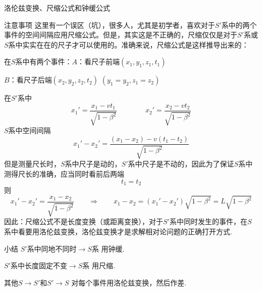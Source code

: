 \documentclass[a4paper,titlepage,onecolmn]{ctexart}
\begin{document}
\begin{section}{洛伦兹变换、尺缩公式和钟缓公式}
\begin{subsection}{注意事项}
这里有一个误区（坑），很多人，尤其是初学者，喜欢对于$S'$系中的两个事件的空间间隔应用尺缩公式。但是，其实这是不正确的，尺缩仅仅是对于$S'$系或$S$系中实实在在的尺子才可以使用的。准确来说，尺缩公式是这样推导出来的：

在$S$系中有两个事件：$A$：看尺子前端$(x_1,y_1,z_1,t_1)$

\hspace{10em} $B$：看尺子后端$(x_2,y_2,z_2,t_2)$ \hspace{4em} $(y_1=y_2,z_1=z_2)$

在$S'$系中
\begin{equation*}
x_1'=\frac{x_1-vt_1}{\sqrt{1-\beta^2}} \hspace{4em} x_2'=\frac{x_2-vt_2}{\sqrt{1-\beta^2}}
\end{equation*}
$S$系中空间间隔
\begin{equation*}
x_1'-x_2'=\frac{(x_1-x_2)-v(t_1-t_2)}{\sqrt{1-\beta^2}}
\end{equation*}
但是测量尺长时，$S$系中尺子是动的，$S'$系中尺子是不动的，因此为了保证$S$系中测得尺长的准确，应当同时看前后两端
\begin{equation*}
t_1=t_2
\end{equation*}
则
\begin{equation*}
x_1'-x_2'=\frac{x_1-x_2}{\sqrt{1-\beta^2}} \hspace{2em} \Rightarrow \hspace{2em}
x_1-x_2=(x_1'-x_2')\sqrt{1-\beta^2}=L\sqrt{1-\beta^2}
\end{equation*}
因此：尺缩公式不是长度变换（或距离变换），对于$S'$系中同时发生的事件，在$S$系中看要用洛伦兹变换，洛伦兹变换才是求解相对论问题的正确打开方式.
\end{subsection}

\begin{subsection}{小结}
$S'$系中同地不同时$ \rightarrow S$系 \hspace{2em} 用钟缓.

$S'$系中长度固定不变$ \rightarrow S$系 \hspace{1em} 用尺缩.

其他$S \rightarrow S'$和$S' \rightarrow S$ \hspace{4em}对每个事件用洛伦兹变换，然后作差.
\end{subsection}


\end{section}
\end{document}
